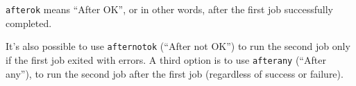 \begin{prompt}
\end{prompt}

\lstinline|afterok| means ``After OK'', or in other words, after the first job successfully completed.

It's also possible to use \lstinline|afternotok| (``After not OK'') to run the second job
only if the first job exited with errors. A third option is to use \lstinline|afterany| (``After any''),
to run the second job after the first job (regardless of success or failure).
